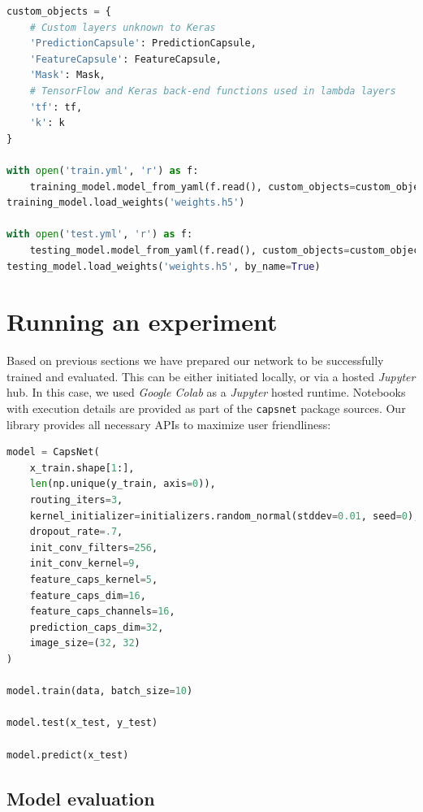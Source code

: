 \begin{lstlisting}[language=Python, caption=Loading a model in \textit{Keras}]
custom_objects = {
    # Custom layers unknown to Keras
    'PredictionCapsule': PredictionCapsule,
    'FeatureCapsule': FeatureCapsule,
    'Mask': Mask,
    # TensorFlow and Keras back-end functions used in lambda layers
    'tf': tf,
    'k': k
}

with open('train.yml', 'r') as f:
    training_model.model_from_yaml(f.read(), custom_objects=custom_objects)
training_model.load_weights('weights.h5')

with open('test.yml', 'r') as f:
    testing_model.model_from_yaml(f.read(), custom_objects=custom_objects)
testing_model.load_weights('weights.h5', by_name=True)
\end{lstlisting}

\section{Running an experiment}

Based on previous sections we have prepared our network to be successfully trained and evaluated. This can be either initiated locally, or via a hosted \textit{Jupyter} hub. In this case, we used \textit{Google Colab} as a \textit{Jupyter} hosted runtime. Notebooks with execution details are provided as part of the \texttt{capsnet} package sources. Our library provides all necessary APIs to maximize user friendliness:

\begin{lstlisting}[language=Python, caption=Running an experiment using \texttt{capsnet}]
model = CapsNet(
    x_train.shape[1:],
    len(np.unique(y_train, axis=0)),
    routing_iters=3,
    kernel_initializer=initializers.random_normal(stddev=0.01, seed=0),
    dropout_rate=.7,
    init_conv_filters=256,
    init_conv_kernel=9,
    feature_caps_kernel=5,
    feature_caps_dim=16,
    feature_caps_channels=16,
    prediction_caps_dim=32,
    image_size=(32, 32)
)

model.train(data, batch_size=10)

model.test(x_test, y_test)

model.predict(x_test)
\end{lstlisting}

\subsection{Model evaluation}

